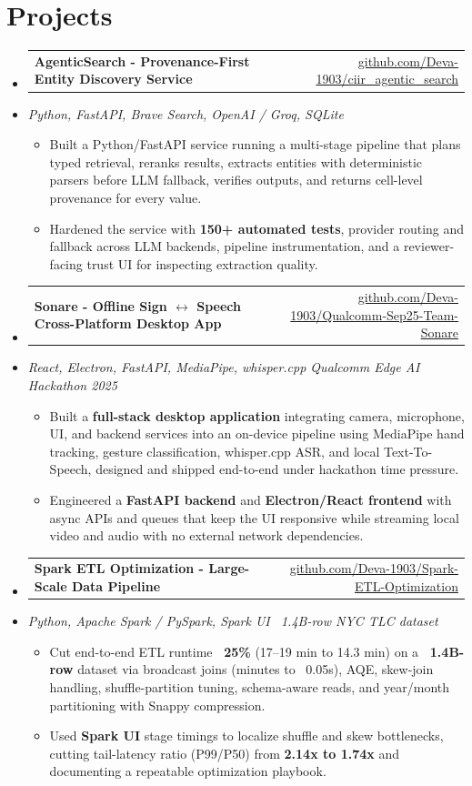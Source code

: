 \documentclass[letterpaper,10pt]{article}
\makeatletter
\newcommand{\resumeItem}[1]{
  \item\small{#1\vspace{-1pt}}
}
\newcommand{\resumeProjectHeading}[2]{
    \item
    \begin{tabular*}{0.985\textwidth}[t]{l@{\extracolsep{\fill}}r}
      \small\textbf{#1} & \small #2 \\
    \end{tabular*}\vspace{-5pt}
}
\newcommand{\resumeProjectSubheading}[1]{
  \vspace{-2pt}\item[] {\small\textcolor{ResumeSlate}{\emph{#1}}}\vspace{-3pt}
}
\newcommand{\resumeSubHeadingListStart}{\begin{itemize}[leftmargin=0.0in, label={}, itemsep=2pt, topsep=2pt]}
\newcommand{\resumeSubHeadingListEnd}{\end{itemize}}
\newcommand{\resumeItemListStart}{\begin{itemize}[leftmargin=0.18in, itemsep=2pt, topsep=1pt]}
\newcommand{\resumeItemListEnd}{\end{itemize}\vspace{-4pt}}
\makeatother
\begin{document}
\section{Projects}
\resumeSubHeadingListStart
  \resumeProjectHeading
    {AgenticSearch - Provenance-First Entity Discovery Service}
    {\href{https://github.com/Deva-1903/ciir_agentic_search}{github.com/Deva-1903/ciir\_agentic\_search}}
  \resumeProjectSubheading{Python, FastAPI, Brave Search, OpenAI / Groq, SQLite}
    \resumeItemListStart
      \resumeItem{Built a Python/FastAPI service running a multi-stage pipeline that plans typed retrieval, reranks results, extracts entities with deterministic parsers before LLM fallback, verifies outputs, and returns cell-level provenance for every value.}
      \resumeItem{Hardened the service with \textbf{150+ automated tests}, provider routing and fallback across LLM backends, pipeline instrumentation, and a reviewer-facing trust UI for inspecting extraction quality.}
    \resumeItemListEnd
  \resumeProjectHeading
    {Sonare - Offline Sign \(\leftrightarrow\) Speech Cross-Platform Desktop App}
    {\href{https://github.com/Deva-1903/Qualcomm-Sep25-Team-Sonare}{github.com/Deva-1903/Qualcomm-Sep25-Team-Sonare}}
  \resumeProjectSubheading{React, Electron, FastAPI, MediaPipe, whisper.cpp \enspace\textbar\enspace Qualcomm Edge AI Hackathon 2025}
    \resumeItemListStart
      \resumeItem{Built a \textbf{full-stack desktop application} integrating camera, microphone, UI, and backend services into an on-device pipeline using MediaPipe hand tracking, gesture classification, whisper.cpp ASR, and local Text-To-Speech, designed and shipped end-to-end under hackathon time pressure.}
      \resumeItem{Engineered a \textbf{FastAPI backend} and \textbf{Electron/React frontend} with async APIs and queues that keep the UI responsive while streaming local video and audio with no external network dependencies.}
    \resumeItemListEnd
  \resumeProjectHeading
    {Spark ETL Optimization - Large-Scale Data Pipeline}
    {\href{https://github.com/Deva-1903/Spark-ETL-Optimization}{github.com/Deva-1903/Spark-ETL-Optimization}}
  \resumeProjectSubheading{Python, Apache Spark / PySpark, Spark UI \enspace\textbar\enspace ~1.4B-row NYC TLC dataset}
    \resumeItemListStart
      \resumeItem{Cut end-to-end ETL runtime \textbf{~25\%} (17--19 min to 14.3 min) on a \textbf{~1.4B-row} dataset via broadcast joins (minutes to ~0.05s), AQE, skew-join handling, shuffle-partition tuning, schema-aware reads, and year/month partitioning with Snappy compression.}
      \resumeItem{Used \textbf{Spark UI} stage timings to localize shuffle and skew bottlenecks, cutting tail-latency ratio (P99/P50) from \textbf{2.14x to 1.74x} and documenting a repeatable optimization playbook.}
    \resumeItemListEnd
\resumeSubHeadingListEnd
\vspace{-4pt}
\end{document}
